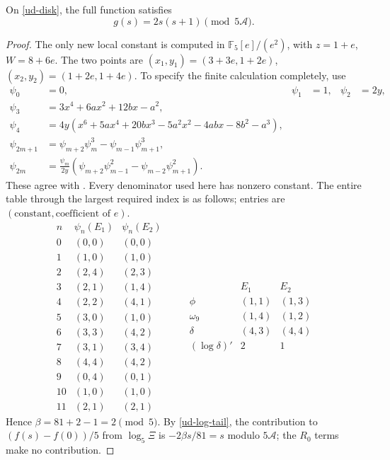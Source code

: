 \begin{lemma}
\label{ud-reduction}
On \eqref{ud-disk}, the full function satisfies
\begin{equation}
 g(s)=2s(s+1)\pmod{5\mathcal A}.
 \label{ud-polynomial}
\end{equation}
\end{lemma}
\begin{proof}
The only new local constant is computed in
\(\mathbb F_5[e]/(e^2)\), with \(z=1+e\), \(W=8+6e\).
The two points are
\((x_1,y_1)=(3+3e,1+2e)\),
\((x_2,y_2)=(1+2e,1+4e)\).
To specify the finite calculation completely, use
\begin{align}
 \psi_0&=0,&\psi_1&=1,&\psi_2&=2y,\\
 \psi_3&=3x^4+6ax^2+12bx-a^2,\\
 \psi_4&=4y(x^6+5ax^4+20bx^3-5a^2x^2-4abx-8b^2-a^3),\\
 \psi_{2m+1}&=\psi_{m+2}\psi_m^3-\psi_{m-1}\psi_{m+1}^3,\\
 \psi_{2m}&=\frac{\psi_m}{2y}
       (\psi_{m+2}\psi_{m-1}^2-\psi_{m-2}\psi_{m+1}^2).
 \label{ud-recurrences}
\end{align}
These agree with \cite[\S5.5]{SutherlandDivisionPolynomials2023}.
Every denominator used here has nonzero constant. The entire table
through the largest required index is as follows; entries are
\((\text{constant},\text{coefficient of }e)\).
\[
\begin{array}{c|cc}
 n&\psi_n(E_1)&\psi_n(E_2)\\\hline
0&(0,0)&(0,0)\\1&(1,0)&(1,0)\\2&(2,4)&(2,3)\\
3&(2,1)&(1,4)\\4&(2,2)&(4,1)\\5&(3,0)&(1,0)\\
6&(3,3)&(4,2)\\7&(3,1)&(3,4)\\8&(4,4)&(4,2)\\
9&(0,4)&(0,1)\\10&(1,0)&(1,0)\\11&(2,1)&(2,1)
\end{array}
\qquad
\begin{array}{c|cc}
 &E_1&E_2\\\hline
 \phi&(1,1)&(1,3)\\
 \omega_9&(1,4)&(1,2)\\
 \delta&(4,3)&(4,4)\\
 (\log\delta)'&2&1
\end{array}
\]
Hence \(\beta=81+2-1=2\pmod5\). By \eqref{ud-log-tail}, the
contribution to \((f(s)-f(0))/5\) from \(\log_5\Xi\) is
\(-2\beta s/81=s\) modulo \(5\mathcal A\); the \(R_0\) terms
make no contribution.


\end{proof}
